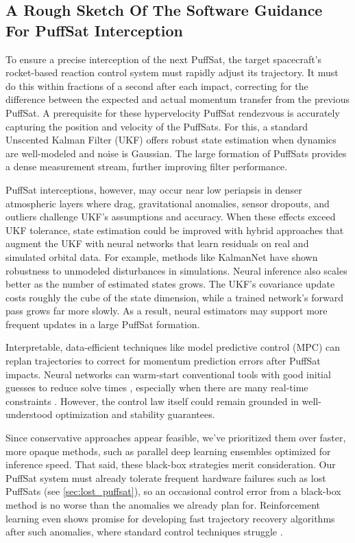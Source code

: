 \documentclass{article}
\begin{document}
\subsection{A Rough Sketch Of The Software Guidance For PuffSat Interception}\label{sec:neural_navigation}
To ensure a precise interception of the next PuffSat, the target spacecraft's rocket-based reaction control system must rapidly adjust its trajectory. It must do this within fractions of a second after each impact, correcting for the difference between the expected and actual momentum transfer from the previous PuffSat. A prerequisite for these hypervelocity PuffSat rendezvous is accurately capturing the position and velocity of the PuffSats. For this, a standard Unscented Kalman Filter (UKF) \cite{wan2000unscented} offers robust state estimation when dynamics are well-modeled and noise is Gaussian. The large formation of PuffSats provides a dense measurement stream, further improving filter performance. 

PuffSat interceptions, however, may occur near low periapsis in denser atmospheric layers where drag, gravitational anomalies, sensor dropouts, and outliers challenge UKF's assumptions and accuracy. When these effects exceed UKF tolerance, state estimation could be improved with hybrid approaches that augment the UKF with neural networks that learn residuals on real and simulated orbital data. For example, methods like KalmanNet \cite{revach_2022_kalmannet,revach2022unsupervised} have shown robustness to unmodeled disturbances in simulations. Neural inference also scales better as the number of estimated states grows.  The UKF's covariance update costs roughly the cube of the state dimension, while a trained network's forward pass grows far more slowly. As a result, neural estimators may support more frequent updates in a large PuffSat formation. 

Interpretable, data-efficient techniques like model predictive control (MPC) can replan trajectories to correct for momentum prediction errors after PuffSat impacts. Neural networks can warm-start conventional tools with good initial guesses to reduce solve times \cite{guffanti2024transformerstrajectoryoptimizationapplication}, especially when there are many real-time constraints \cite{briden_constraint}. However, the control law itself could remain grounded in well-understood optimization and stability guarantees. 

Since conservative approaches appear feasible, we've prioritized them over faster, more opaque methods, such as parallel deep learning ensembles optimized for inference speed. That said, these black-box strategies merit consideration. Our PuffSat system must already tolerate frequent hardware failures such as lost PuffSats (see \autoref{sec:lost_puffsat}), so an occasional control error from a black-box method is no worse than the anomalies we already plan for. Reinforcement learning even shows promise for developing fast trajectory recovery algorithms after such anomalies, where standard control techniques struggle \cite{zavoli2021reinforcement}.
\end{document}
